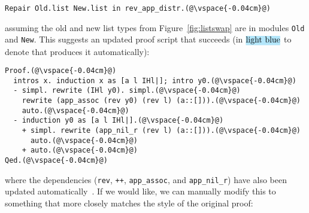 \begin{figure*}
\begin{minipage}{0.46\textwidth}
   
\end{minipage}
\hfill
\begin{minipage}{0.46\textwidth}
   
\end{minipage}
\vspace{-0.4cm}
\caption{The updated \lstinline{list} (right) is the old \lstinline{list} (left) with its two constructors swapped ().}
\label{fig:listswap}
\end{figure*}

\begin{figure*}
\vspace{-0.3cm}
\caption{Two functions between \lstinline{Old.list} and \lstinline{New.list} (top) that form an equivalence (bottom).}
\label{fig:equivalence}
\end{figure*}

\begin{lstlisting}
Repair Old.list New.list in rev_app_distr.(@\vspace{-0.04cm}@)
\end{lstlisting}
assuming the old and new list types from Figure~\ref{fig:listswap} are in modules \lstinline{Old} and \lstinline{New}.
This suggests an updated proof script that succeeds (in $\codeauto{light blue}$ to denote that \toolname produces it automatically):

\begin{lstlisting}[backgroundcolor=\color{cyan!30}]
Proof.(@\vspace{-0.04cm}@)
  intros x. induction x as [a l IHl|]; intro y0.(@\vspace{-0.04cm}@)
  - simpl. rewrite (IHl y0). simpl.(@\vspace{-0.04cm}@)
    rewrite (app_assoc (rev y0) (rev l) (a::[])).(@\vspace{-0.04cm}@)
    auto.(@\vspace{-0.04cm}@)
  - induction y0 as [a l IHl|].(@\vspace{-0.04cm}@)
    + simpl. rewrite (app_nil_r (rev l) (a::[])).(@\vspace{-0.04cm}@)
      auto.(@\vspace{-0.04cm}@)
    + auto.(@\vspace{-0.04cm}@)
Qed.(@\vspace{-0.04cm}@)
\end{lstlisting}
where the dependencies (\lstinline{rev}, \lstinline{++}, \lstinline{app_assoc}, and \lstinline{app_nil_r}) have
also been updated automatically~. %
If we would like, we can manually modify this to something that more closely matches the style of the original proof:

